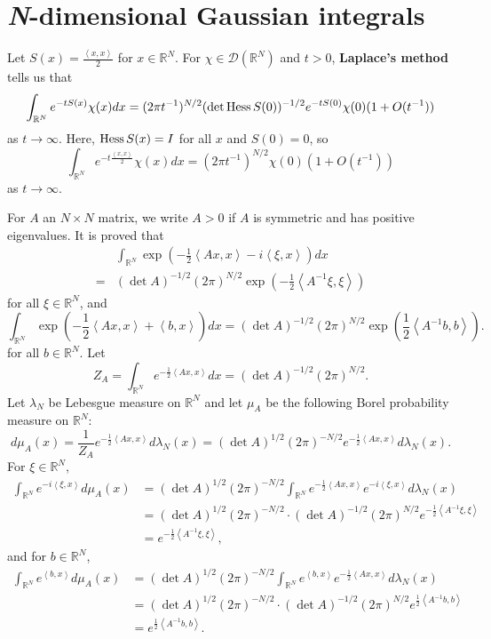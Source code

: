 \documentclass{article}
\newcommand{\inner}[2]{\left\langle #1, #2 \right\rangle}
\newcommand{\Hess}{\ensuremath\mathrm{Hess}\,}
\theoremstyle{definition}
\begin{document}
\section{{\em N}-dimensional Gaussian integrals}
Let $S(x) = \frac{\inner{x}{x}}{2}$ for $x \in \mathbb{R}^N$. 
For $\chi \in \mathscr{D}(\mathbb{R}^N)$ and $t>0$,
\textbf{Laplace's method}
tells us that 
\[
\int_{\mathbb{R}^N} e^{-tS(x)} \chi(x) dx 
= (2\pi t^{-1})^{N/2} (\det \Hess S(0))^{-1/2} e^{-tS(0)} \chi(0) (1+O(t^{-1}))
\]
as $t \to \infty$. 
Here, $\Hess S(x) = I$ for all $x$ and $S(0)=0$, so
\[
\int_{\mathbb{R}^N} e^{-t \frac{\inner{x}{x}}{2}} \chi(x) dx = (2\pi t^{-1})^{N/2} \chi(0) (1+O(t^{-1}))
\]
as $t \to \infty$. 

For $A$ an $N \times N$ matrix, we write $A>0$ if $A$ is symmetric and has positive eigenvalues.
 It
 is proved that
\[
\begin{split}
&\int_{\mathbb{R}^N} \exp\left(-\frac{1}{2} \inner{Ax}{x} - i\inner{\xi}{x} \right) dx\\
=&(\det A)^{-1/2} (2\pi)^{N/2} \exp\left( -\frac{1}{2} \inner{A^{-1} \xi}{\xi} \right)
\end{split}
\]
for all $\xi \in \mathbb{R}^N$, and 
\[
\int_{\mathbb{R}^N} \exp\left(-\frac{1}{2}\inner{Ax}{x}+\inner{b}{x}\right) dx = (\det A)^{-1/2} (2\pi)^{N/2}
\exp\left(\frac{1}{2}\inner{A^{-1}b}{b}\right).
\]
for all $b \in \mathbb{R}^N$. 
Let
\[
Z_A = \int_{\mathbb{R}^N} e^{-\frac{1}{2}\inner{Ax}{x}} dx
=(\det A)^{-1/2} (2\pi)^{N/2}.
\]
Let $\lambda_N$ be Lebesgue measure on $\mathbb{R}^N$ and
let $\mu_A$ be the following Borel probability measure on $\mathbb{R}^N$:
\[
d\mu_A(x) = \frac{1}{Z_A} e^{-\frac{1}{2}\inner{Ax}{x}} d\lambda_N(x)
=(\det A)^{1/2} (2\pi)^{-N/2} e^{-\frac{1}{2}\inner{Ax}{x}} d\lambda_N(x).
\]
For $\xi \in \mathbb{R}^N$, 
\begin{align*}
\int_{\mathbb{R}^N} e^{-i\inner{\xi}{x}} d\mu_A(x)&=
(\det A)^{1/2} (2\pi)^{-N/2} \int_{\mathbb{R}^N} e^{-\frac{1}{2}\inner{Ax}{x}} e^{-i\inner{\xi}{x}} d\lambda_N(x)\\
&=(\det A)^{1/2} (2\pi)^{-N/2}  \cdot (\det A)^{-1/2} (2\pi)^{N/2} e^{-\frac{1}{2}\inner{A^{-1}\xi}{\xi}}\\
&=e^{-\frac{1}{2}\inner{A^{-1}\xi}{\xi}},
\end{align*}
and for $b \in \mathbb{R}^N$,
\begin{align*}
\int_{\mathbb{R}^N} e^{\inner{b}{x}} d\mu_A(x)&=
(\det A)^{1/2} (2\pi)^{-N/2}  \int_{\mathbb{R}^N} e^{\inner{b}{x}}
e^{-\frac{1}{2}\inner{Ax}{x}} d\lambda_N(x)\\
&=(\det A)^{1/2} (2\pi)^{-N/2}   \cdot
(\det A)^{-1/2} (2\pi)^{N/2}
e^{\frac{1}{2}\inner{A^{-1}b}{b}}\\
&=e^{\frac{1}{2}\inner{A^{-1}b}{b}}.
\end{align*}
\end{document}
